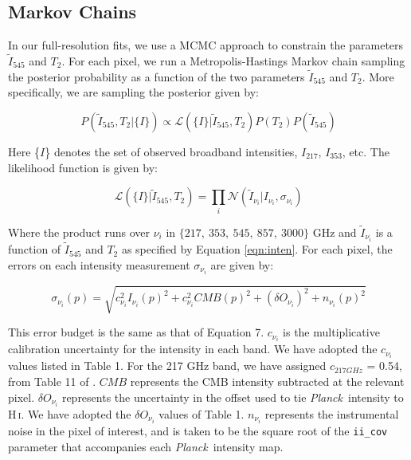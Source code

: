 \documentclass{emulateapj}
\newcommand{\PLANCK}{{\it Planck}}
\begin{document}
\subsection{Markov Chains}
\label{sec:mcmc}

In our full-resolution fits, we use a MCMC approach to constrain the 
parameters $\tilde{I}_{545}$ and $T_2$. For each pixel, we run a 
Metropolis-Hastings Markov chain sampling the posterior probability as a 
function of the two parameters $\tilde{I}_{545}$ and $T_2$. More specifically, 
we are sampling the posterior given by:


\begin{equation}
\label{eqn:post}
P(\tilde{I}_{545}, T_2|\{I\}) \propto \mathcal{L}(\{I\}|\tilde{I}_{545}, T_2)P(T_2)P(\tilde{I}_{545})
\end{equation}


Here \{$I$\} denotes the set of observed broadband intensities, $I_{217}$, 
$I_{353}$, etc. The likelihood function is given by:

\begin{equation} \label{equ:like}
\mathcal{L}(\{I\}|\tilde{I}_{545}, T_2) = \displaystyle\prod\limits_{i}\mathcal{N}(\tilde{I}_{\nu_{i}}|I_{\nu_{i}}, \sigma_{\nu_i})
\end{equation}


Where the product runs over $\nu_i$ in $\{217,\ 353,\ 545,\ 857,\ 3000\}$ GHz
and $\tilde{I}_{\nu_i}$ is a function of $\tilde{I}_{545}$ and $T_2$ as 
specified by Equation \ref{eqn:inten}. For each pixel, the errors on each 
intensity measurement $\sigma_{\nu_i}$ are given by:

\begin{equation}
\sigma_{\nu_i}(p) = \sqrt{c^2_{\nu_i}I_{\nu_i}(p)^2 + c^2_{\nu_i}CMB(p)^2 + (\delta O_{\nu_i})^2 + n_{\nu_i}(p)^2}
\end{equation}


This error budget is the same as that of \cite{planckdust} Equation 7. 
$c_{\nu_i}$ is the multiplicative calibration uncertainty for the intensity in 
each band. We have adopted the $c_{\nu_i}$ values listed in \cite{planckdust} 
Table 1. For the 217 GHz band, we have assigned $c_{217 GHz}$ = 0.54, from 
Table 11 of \cite{planckcalib}. $CMB$ represents the CMB intensity 
subtracted at the relevant pixel. $\delta O_{\nu_i}$ represents the uncertainty
in the offset used to tie \PLANCK~intensity to H\,\textsc{i}. We have adopted 
the  $\delta O_{\nu_i}$ values of \cite{planckdust} Table 1. $n_{\nu_i}$ 
represents the instrumental noise in the pixel of interest, and is taken to be 
the square root of the \verb|ii_cov| parameter that accompanies each 
\PLANCK~intensity map.
\end{document}

